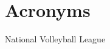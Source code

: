 \chapter{Acronyms}
\label{chap:acronyms}

\begin{acronym}[SINTICE]
	   {National Volleyball League}
\end{acronym}

